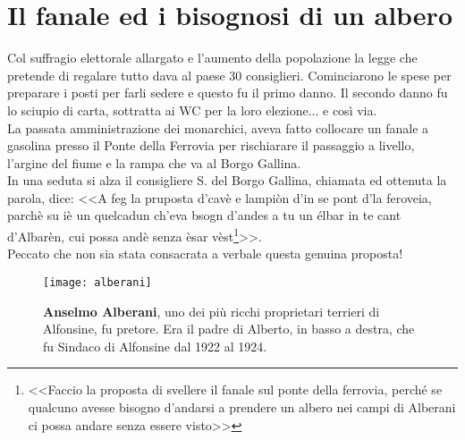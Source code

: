 
\chapter{Il fanale ed i bisognosi di un albero}
Col suffragio elettorale allargato e l'aumento della popolazione la legge che pretende di regalare tutto dava al paese 30 consiglieri. Cominciarono le spese per preparare i posti per farli sedere e questo fu il primo danno. Il secondo danno fu lo sciupio di carta, sottratta ai WC per la loro elezione... e così via.\\
\indent La passata amministrazione dei monarchici, aveva fatto collocare un fanale a gasolina presso il Ponte della Ferrovia per rischiarare il passaggio a livello, l'argine del fiume e la rampa che va al Borgo Gallina.\\
\indent In una seduta si alza il consigliere S.\: \: del Borgo Gallina, chiamata ed ottenuta la parola, dice: <<A feg la pruposta d'cavè e lampiòn d'in se pont d'la feroveia, parchè su iè un quelcadun ch'eva bsogn d'andes a tu un élbar in te cant d'Albarèn, cui possa andè senza èsar vèst\footnote{<<Faccio la proposta di svellere il fanale sul ponte della ferrovia, perché se qualcuno avesse bisogno d'andarsi a prendere un albero nei campi di Alberani ci possa andare senza essere visto>>}>>.\\
\indent Peccato che non sia stata consacrata a verbale questa genuina proposta!

 \begin{figure}[htb]
    \centering
    \texttt{[image: alberani]}
    \caption[Anselmo Alberani]{\textbf{Anselmo Alberani}, uno dei più ricchi proprietari terrieri di Alfonsine, fu pretore. Era il padre di Alberto, in basso a destra, che fu Sindaco di Alfonsine dal 1922 al 1924.\label{fig:alberani}}
\end{figure}